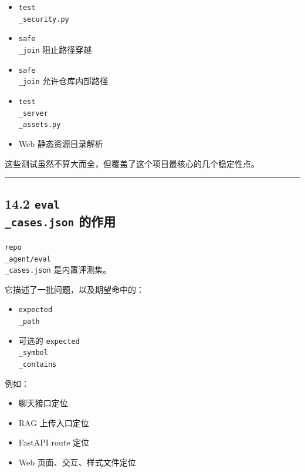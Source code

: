 \documentclass[UTF8,12pt,openany]{ctexbook}
\begin{document}
\begin{itemize}
\item \texttt{test\\_security.py}
\item \texttt{safe\\_join} 阻止路径穿越
\item \texttt{safe\\_join} 允许仓库内部路径
\end{itemize}

\begin{itemize}
\item \texttt{test\\_server\\_assets.py}
\item Web 静态资源目录解析
\end{itemize}

这些测试虽然不算大而全，但覆盖了这个项目最核心的几个稳定性点。\par

\hrule

\subsection{14.2 \texttt{eval\\_cases.json} 的作用}

\texttt{repo\\_agent/eval\\_cases.json} 是内置评测集。\par

它描述了一批问题，以及期望命中的：\par

\begin{itemize}
\item \texttt{expected\\_path}
\item 可选的 \texttt{expected\\_symbol\\_contains}
\end{itemize}

例如：\par

\begin{itemize}
\item 聊天接口定位
\item RAG 上传入口定位
\item FastAPI route 定位
\item Web 页面、交互、样式文件定位
\end{itemize}
\end{document}
